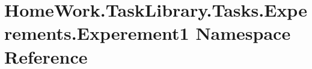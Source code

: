 \hypertarget{namespace_home_work_1_1_task_library_1_1_tasks_1_1_experements_1_1_experement1}{}\section{Home\+Work.\+Task\+Library.\+Tasks.\+Experements.\+Experement1 Namespace Reference}
\label{namespace_home_work_1_1_task_library_1_1_tasks_1_1_experements_1_1_experement1}
